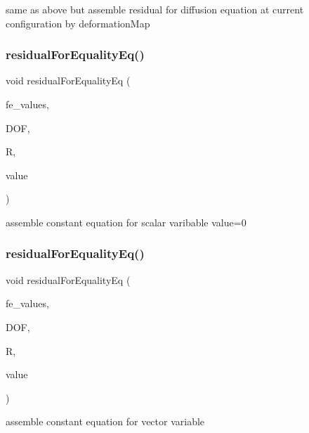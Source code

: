 same as above but assemble residual for diffusion equation at current configuration by deformation\+Map \mbox{\label{class_residual_a130e92c5dacfaf8cb43adab6aa588eb3}} 
\subsubsection{\texorpdfstring{residualForEqualityEq()}{residualForEqualityEq()}\hspace{0.1cm}{\footnotesize\ttfamily [1/2]}}
{\footnotesize\ttfamily void residual\+For\+Equality\+Eq (\begin{DoxyParamCaption}\item[{const F\+E\+Values$<$ dim $>$ \&}]{fe\+\_\+values,  }\item[{unsigned int}]{D\+OF,  }\item[{dealii\+::\+Table$<$ 1, T $>$ \&}]{R,  }\item[{dealii\+::\+Table$<$ 1, T $>$ \&}]{value }\end{DoxyParamCaption})}

assemble constant equation for scalar varibable value=0 \mbox{\label{class_residual_aec6bd7f3e82fa9b13de1dc4074801afd}} 
\subsubsection{\texorpdfstring{residualForEqualityEq()}{residualForEqualityEq()}\hspace{0.1cm}{\footnotesize\ttfamily [2/2]}}
{\footnotesize\ttfamily void residual\+For\+Equality\+Eq (\begin{DoxyParamCaption}\item[{const F\+E\+Values$<$ dim $>$ \&}]{fe\+\_\+values,  }\item[{unsigned int}]{D\+OF,  }\item[{dealii\+::\+Table$<$ 1, T $>$ \&}]{R,  }\item[{dealii\+::\+Table$<$ 2, T $>$ \&}]{value }\end{DoxyParamCaption})}

assemble constant equation for vector variable \mbox{\label{class_residual_ab90bb5476a96c0e7098264562b313b7b}} 
